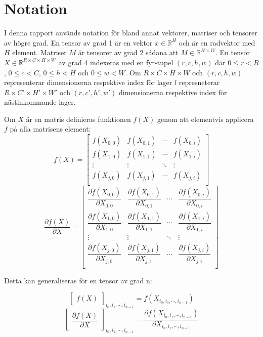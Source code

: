 \documentclass[a4paper,11pt,twoside]{article}
\newcommand*{\pd}[2]{\ensuremath{\dfrac{\partial #1}{\partial #2}}}
\begin{document}
\newpage
\section{Notation}
I denna rapport används notation för bland annat vektorer, matriser och tensorer av högre grad. En tensor av grad 1 är en vektor $x \in \mathbb{R}^H$ och är en radvektor med $H$ element. Matriser $M$ är tensorer av grad 2 sådana att $M \in \mathbb{R}^{H \times W}$. En tensor $X \in \mathbb{R}^{R \times C \times H \times W}$ av grad 4 indexeras med en fyr-tupel $(r,c,h,w)$ där $0 \leq r < R$, $0 \leq c < C$, $0 \leq h < H$ och $0 \leq w < W$. Om $R \times C \times H \times W$ och $(r,c,h,w)$ representerar dimensionerna respektive index för lager $l$ represneterar $R \times C' \times H' \times W'$ och $(r,c',h',w')$ dimensionerna respektive index för nästinkommande lager.

Om $X$ är en matris definieras funktionen $f(X)$ genom att elementvis applicera $f$ på alla matrisens element:
\begin{equation}
	f(X) = 
	\begin{bmatrix}
	f(X_{0,0}) & f(X_{0,1}) & \cdots & f(X_{0,i}) \\
	f(X_{1,0}) & f(X_{1,1}) & \cdots & f(X_{1,i}) \\
	\vdots     & \vdots     & \ddots & \vdots     \\
	f(X_{j,0}) & f(X_{j,1}) & \cdots & f(X_{j,i}) \\
	\end{bmatrix}
\end{equation}
\begin{equation}
	\pd{f(X)}{X} = 
	\begin{bmatrix}
	\pd{f(X_{0,0})}{X_{0,0}} & \pd{f(X_{0,1})}{X_{0,1}} & \cdots & \pd{f(X_{0,i})}{X_{0,i}} \\
	\pd{f(X_{1,0})}{X_{1,0}} & \pd{f(X_{1,1})}{X_{1,1}} & \cdots & \pd{f(X_{1,i})}{X_{1,i}} \\
	\vdots                   & \vdots                   & \ddots & \vdots     \\
	\pd{f(X_{j,0})}{X_{j,0}} & \pd{f(X_{j,1})}{X_{j,1}} & \cdots & \pd{f(X_{j,i})}{X_{j,i}} \\
	\end{bmatrix}
\end{equation}


Detta kan generaliseras för en tensor av grad n:

\begin{equation}\label{f(x)}
	\begin{bmatrix} f(X) \end{bmatrix}_{i_0, i_1, \cdots, i_{n-1}}
	= f(X_{i_0, i_1, \cdots, i_{n-1}})
\end{equation}
\begin{equation}\label{f'(x)}
	\begin{bmatrix}
	\pd{f(X)}{X}
	\end{bmatrix}_{i_0, i_1, \cdots, i_{n-1}}
	=
	\pd{f(X_{i_0, i_1, \cdots, i_{n-1}})}{X_{i_0, i_1, \cdots, i_{n-1}}}
\end{equation}
\end{document}
